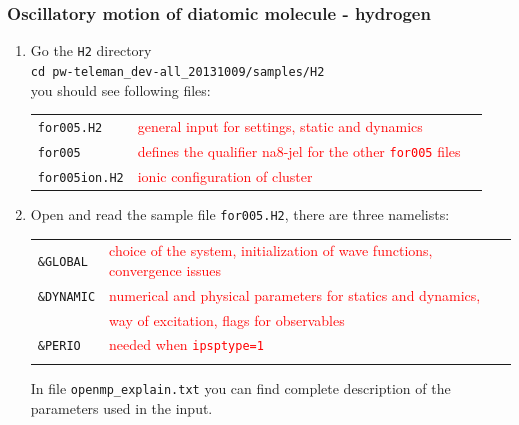 \documentclass[10pt]{beamer}
\begin{document}
\begin{frame}
\frametitle{Oscillatory motion of diatomic molecule - hydrogen}
\begin{enumerate}
\item Go the {\tt H2} directory\\
\vspace*{0.2cm}
{\tt cd pw-teleman\_dev-all\_20131009/samples/H2}\\
\vspace*{0.2cm}
you should see following files:\\
\vspace*{0.2cm}
\begin{tabular}{lll}
{\tt for005.H2} &{\scriptsize{\textcolor{red}{general input for settings, static and dynamics}}}\\
{\tt for005}  &{\scriptsize{\textcolor{red}{defines the qualifier na8-jel for the other {\tt for005} files}}}\\
{\tt for005ion.H2} &{\scriptsize{\textcolor{red}{ionic configuration of cluster}}}\\
\end{tabular}
\vspace*{0.4cm}


\item Open and read the sample file {\tt for005.H2}, there are three namelists:\\
\vspace*{0.4cm}
\begin{tabular}{ll}
 {\tt \&GLOBAL} & {\scriptsize{\textcolor{red}{choice of the system, initialization of wave functions, convergence issues}}}\\
{\tt \&DYNAMIC}&{\scriptsize{\textcolor{red}{numerical and physical parameters for statics and dynamics, }}}\\
&{\scriptsize{\textcolor{red}{way of excitation, flags for observables}}}\\
 {\tt \&PERIO}&{\scriptsize{\textcolor{red}{needed when  {\tt ipsptype=1}}}}\\
 \vspace*{0.2cm}
\end{tabular}
In file {\tt openmp\_explain.txt} you can find complete description of the parameters used in the input. 
\end{enumerate}
\end{frame}
\end{document}

